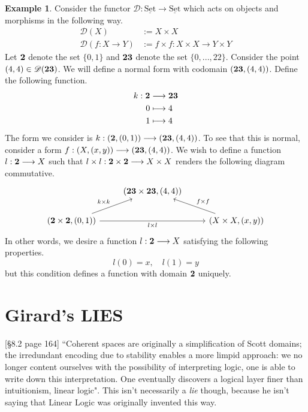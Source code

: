 \documentclass[12pt]{article}
\theoremstyle{plain}
\theoremstyle{definition}
\newtheorem{example}[thm]{Example}
\newcommand{\scr}[1]{\mathscr{#1}}
\newcommand{\lto}{\longrightarrow}
\newcommand{\set}{\operatorname{\underline{Set}}}
\begin{document}
	\begin{example}\label{ex:saturated_normal_form}
		Consider the functor $\scr{D}: \set \lto \set$ which acts on objects and morphisms in the following way.
		\begin{align*}
			\scr{D}(X) &:= X \times X\\
			\scr{D}(f: X \lto Y) &:= f \times f: X \times X \lto Y \times Y
		\end{align*}
		Let $\bold{2}$ denote the set $\lbrace 0, 1 \rbrace$ and $\bold{23}$ denote the set $\lbrace 0, ..., 22\rbrace$. Consider the point $(4,4) \in \scr{D}(\bold{23})$. We will define a normal form with codomain $(\bold{23}, (4,4))$. Define the following function.
		\begin{align}
			k: \bold{2} &\lto \bold{23}\\
			0 &\longmapsto 4\\
			1 &\longmapsto 4
		\end{align}
		The form we consider is $k: (\bold{2},(0,1)) \lto (\bold{23}, (4,4))$. To see that this is normal, consider a form $f: (X, (x,y)) \lto (\bold{23}, (4,4))$. We wish to define a function $l: \bold{2} \lto X$ such that $l \times l: \bold{2} \times \bold{2} \lto X \times X$ renders the following diagram commutative.
		\begin{equation}
			\begin{tikzcd}
				& (\bold{23} \times \bold{23}, (4,4))\\
				(\bold{2} \times \bold{2}, (0,1))\arrow[ur,"{k \times k}"]\arrow[rr,swap,"{l \times l}"] && (X \times X, (x,y))\arrow[ul,swap,"{f \times f}"]
			\end{tikzcd}
		\end{equation}
		In other words, we desire a function $l: \bold{2} \lto X$ satisfying the following properties.
		\begin{equation}
			l(0) = x, \quad l(1) = y
		\end{equation}
		but this condition defines a function with domain $\bold{2}$ uniquely.
	\end{example}
\section{Girard's LIES}
\cite{BS}[\S 8.2 page 164] ``Coherent spaces are originally a simplification of Scott domains; the irredundant encoding due to stability enables a more limpid approach: we no longer content ourselves with the possibility of interpreting logic, one is able to write down this interpretation. One eventually discovers a logical layer finer than intuitionism, linear logic". This isn't necessarily a \emph{lie} though, because he isn't saying that Linear Logic was originally invented this way.
\end{document}
